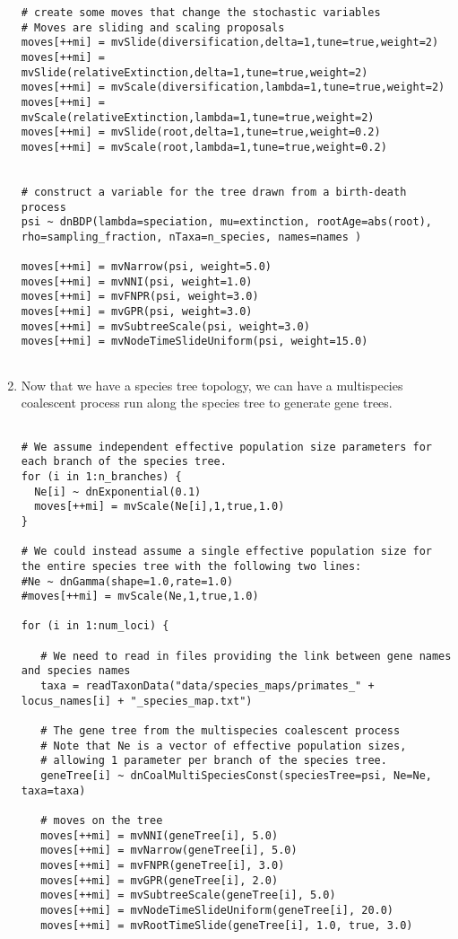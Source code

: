 \begin{enumerate}
{\begin{snugshade*}
\begin{lstlisting}
# create some moves that change the stochastic variables
# Moves are sliding and scaling proposals
moves[++mi] = mvSlide(diversification,delta=1,tune=true,weight=2)
moves[++mi] = mvSlide(relativeExtinction,delta=1,tune=true,weight=2)
moves[++mi] = mvScale(diversification,lambda=1,tune=true,weight=2)
moves[++mi] = mvScale(relativeExtinction,lambda=1,tune=true,weight=2)
moves[++mi] = mvSlide(root,delta=1,tune=true,weight=0.2)
moves[++mi] = mvScale(root,lambda=1,tune=true,weight=0.2)


# construct a variable for the tree drawn from a birth-death process
psi ~ dnBDP(lambda=speciation, mu=extinction, rootAge=abs(root), rho=sampling_fraction, nTaxa=n_species, names=names )

moves[++mi] = mvNarrow(psi, weight=5.0)
moves[++mi] = mvNNI(psi, weight=1.0)
moves[++mi] = mvFNPR(psi, weight=3.0)
moves[++mi] = mvGPR(psi, weight=3.0)
moves[++mi] = mvSubtreeScale(psi, weight=3.0)
moves[++mi] = mvNodeTimeSlideUniform(psi, weight=15.0)


\end{lstlisting}
\end{snugshade*}}
\item Now that we have a species tree topology, we can have a multispecies coalescent process run along the species tree to generate gene trees.
{\tt \begin{snugshade*}
\begin{lstlisting}

# We assume independent effective population size parameters for each branch of the species tree.
for (i in 1:n_branches) {
  Ne[i] ~ dnExponential(0.1)
  moves[++mi] = mvScale(Ne[i],1,true,1.0)
}

# We could instead assume a single effective population size for the entire species tree with the following two lines:
#Ne ~ dnGamma(shape=1.0,rate=1.0)
#moves[++mi] = mvScale(Ne,1,true,1.0)

for (i in 1:num_loci) {

   # We need to read in files providing the link between gene names and species names
   taxa = readTaxonData("data/species_maps/primates_" + locus_names[i] + "_species_map.txt")

   # The gene tree from the multispecies coalescent process
   # Note that Ne is a vector of effective population sizes, 
   # allowing 1 parameter per branch of the species tree.
   geneTree[i] ~ dnCoalMultiSpeciesConst(speciesTree=psi, Ne=Ne, taxa=taxa)

   # moves on the tree
   moves[++mi] = mvNNI(geneTree[i], 5.0)
   moves[++mi] = mvNarrow(geneTree[i], 5.0)
   moves[++mi] = mvFNPR(geneTree[i], 3.0)
   moves[++mi] = mvGPR(geneTree[i], 2.0)
   moves[++mi] = mvSubtreeScale(geneTree[i], 5.0)
   moves[++mi] = mvNodeTimeSlideUniform(geneTree[i], 20.0)
   moves[++mi] = mvRootTimeSlide(geneTree[i], 1.0, true, 3.0)


\end{lstlisting}
\end{snugshade*}}
\end{enumerate}
